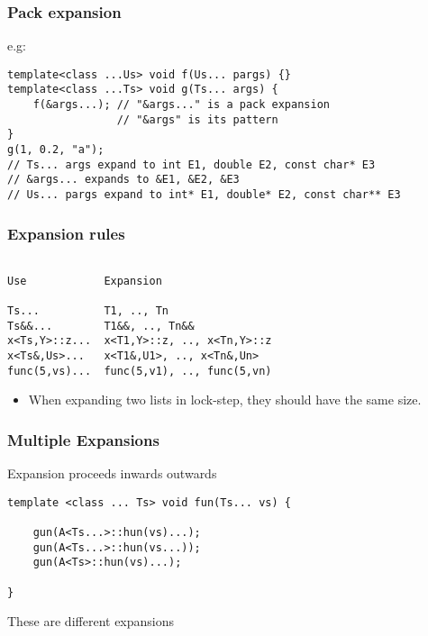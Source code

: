 \documentclass{beamer}
\begin{document}
\begin{frame}[fragile]
\frametitle{Pack expansion}

\begin{block}{e.g:}
\begin{lstlisting}
template<class ...Us> void f(Us... pargs) {}
template<class ...Ts> void g(Ts... args) {
    f(&args...); // "&args..." is a pack expansion
                 // "&args" is its pattern
}
g(1, 0.2, "a"); 
// Ts... args expand to int E1, double E2, const char* E3
// &args... expands to &E1, &E2, &E3
// Us... pargs expand to int* E1, double* E2, const char** E3
\end{lstlisting}
\end{block}

\end{frame}



\begin{frame}[fragile]
\frametitle{Expansion rules}

\begin{lstlisting}

Use            Expansion

Ts...          T1, .., Tn
Ts&&...        T1&&, .., Tn&&
x<Ts,Y>::z...  x<T1,Y>::z, .., x<Tn,Y>::z
x<Ts&,Us>...   x<T1&,U1>, .., x<Tn&,Un>
func(5,vs)...  func(5,v1), .., func(5,vn)

\end{lstlisting}
\begin{itemize}
\item When expanding two lists in lock-step, they should have the same size.
\end{itemize}
\end{frame}


\begin{frame}[fragile]
\frametitle{Multiple Expansions}

\begin{block}{Expansion proceeds inwards outwards}

\begin{lstlisting}
template <class ... Ts> void fun(Ts... vs) {

    gun(A<Ts...>::hun(vs)...);
    gun(A<Ts...>::hun(vs...));
    gun(A<Ts>::hun(vs)...); 

}
\end{lstlisting}
These are different expansions
\end{block}

\end{frame}
\end{document}
